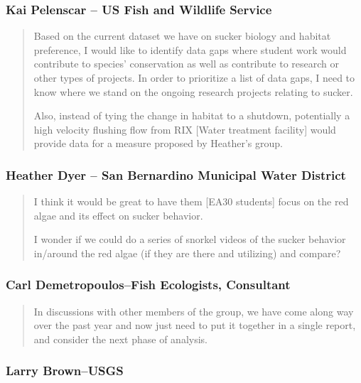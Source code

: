 \documentclass{article}\usepackage[]{graphicx}\usepackage[]{color}
\begin{document}
\subsubsection{Kai Pelenscar -- US Fish and Wildlife Service}

\begin{quote}
Based on the current dataset we have on sucker biology and habitat preference, I would like to identify data gaps where student work would contribute to species' conservation as well as contribute to research or other types of projects. In order to prioritize a list of data gaps, I need to know where we stand on the ongoing research projects relating to sucker.

Also, instead of tying the change in habitat to a shutdown, potentially a high velocity flushing flow from RIX [Water treatment facility] would provide data for a measure proposed by Heather's group. 
\end{quote}

\subsubsection{Heather Dyer -- San Bernardino Municipal Water District}

\begin{quote}
I think it would be great to have them [EA30 students] focus on the red algae and its effect on sucker behavior.  

I wonder if we could do a series of snorkel videos of the sucker behavior in/around the red algae (if they are there and utilizing) and compare?

\end{quote}

\subsubsection{Carl Demetropoulos--Fish Ecologists, Consultant}

\begin{quote}
In discussions with other members of the group, we have come along way over the past year and now just need to put it together in a single report, and consider the next phase of analysis.  
\end{quote}
\subsubsection{Larry Brown--USGS}
\end{document}
